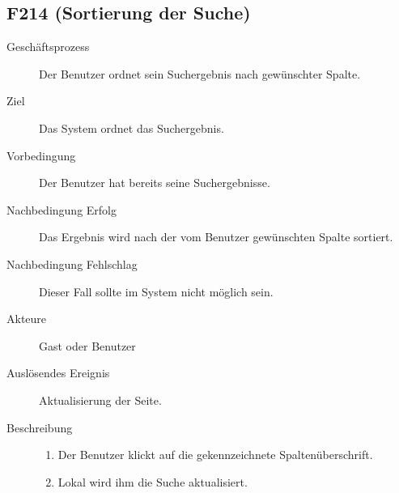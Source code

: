 \subsection{F214 (Sortierung der Suche)}
\begin{description}
  \item[Geschäftsprozess]Der Benutzer ordnet sein Suchergebnis nach gewünschter Spalte.
  \item[Ziel]Das System ordnet das Suchergebnis.
  \item[Vorbedingung]Der Benutzer hat bereits seine Suchergebnisse.
  \item[Nachbedingung Erfolg]Das Ergebnis wird nach der vom Benutzer gewünschten Spalte sortiert.
  \item[Nachbedingung Fehlschlag]Dieser Fall sollte im System nicht möglich sein.
  \item[Akteure]Gast oder Benutzer
  \item[Auslösendes Ereignis]Aktualisierung der Seite.
  \item[Beschreibung]\hfill
    \begin{enumerate}
      \item Der Benutzer klickt auf die gekennzeichnete Spaltenüberschrift.
      \item Lokal wird ihm die Suche aktualisiert.
    \end{enumerate}
\end{description}

